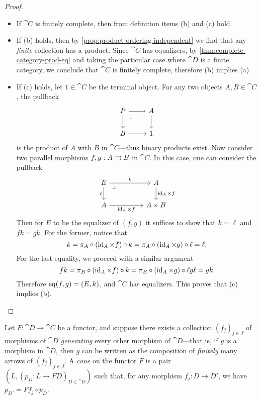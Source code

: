 \begin{proof}
\begin{itemize}\setlength\itemsep{0em}
\item If \(\cat C\) is finitely complete, then from definition items (b) and (c)
  hold.
\item If (b) holds, then by \cref{prop:product-ordering-independent} we find
  that any \emph{finite} collection has a product. Since \(\cat C\) has
  equalizers, by \cref{thm:complete-category-prod-eq} and taking the particular
  case where \(\cat D\) is a finite category, we conclude that \(\cat C\) is
  finitely complete, therefore (b) implies (a).
\item If (c) holds, let \(1 \in \cat C\) be the terminal object. For any two
  objects \(A, B \in \cat C\), the pullback
  \[
  \begin{tikzcd}
  P \ar[r] \ar[d] \ar[rd, phantom, very near start, "\lrcorner"]
  &A \ar[d, dashed] \\
  B \ar[r, dashed] &1
  \end{tikzcd}
  \]
  is the product of \(A\) with \(B\) in \(\cat C\)---thus binary products
  exist. Now consider two parallel morphisms \(f, g: A \rightrightarrows B\) in \(\cat
  C\). In this case, one can consider the pullback
  \[
  \begin{tikzcd}
  E \ar[rr, "k"]  \ar[d, "\ell"']
  \ar[rrd, phantom, very near start, "\lrcorner"]
  &&A \ar[d, "\Id_A \times f"] \\
  A \ar[rr, "\Id_A \times f"']
  &&A \times B
  \end{tikzcd}
  \]
  Then for \(E\) to be the equalizer of \((f,g)\) it suffices to show that
  \(k = \ell\) and \(f k = g k\). For the former, notice that
  \[
  k = \pi_A \circ (\operatorname{id}_A \times f) \circ k
  = \pi_A \circ (\operatorname{id}_A \times g) \circ \ell
  = \ell.
  \]
  For the last equality, we proceed with a similar argument
  \[
  f k = \pi_B \circ (\operatorname{id}_A \times f) \circ k
  = \pi_B \circ (\operatorname{id}_A \times g) \circ \ell
  g \ell
  = g k.
  \]
  Therefore \(\operatorname{eq}(f, g) = (E, k)\), and \(\cat C\) has equalizers. This proves
  that (c) implies (b).
\end{itemize}
\end{proof}

\begin{proposition}
\label{prop:equiv-def-cone-on-func-from-graph}
Let \(F: \cat D \to \cat C\) be a functor, and suppose there exists a collection
\((f_j)_{j \in J}\) of morphisms of \(\cat D\) \emph{generating} every other
morphism of \(\cat D\)---that is, if \(g\) is a morphism in \(\cat D\), then
\(g\) can be written as the composition of \emph{finitely} many arrows of
\((f_j)_{j \in J}\). A \emph{cone} on the functor \(F\) is a pair \((L, (p_D: L
\to F D)_{D \in \cat D})\) such that, for any morphism \(f_j: D \to D'\), we
have \(p_{D'} = F f_j \circ p_D\).
\end{proposition}


